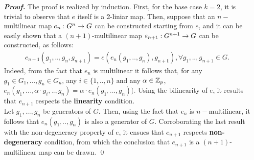 \textbf{\textit{Proof.}} The proof is realized by induction. First, for the base case $k = 2$, it is trivial to observe that $e$ itself is a 2-liniar map. Then, suppose that an $n-$multilinear map $e_n:G^n\rightarrow G$ can be constructed starting from $e$, and it can be easily shown that a $(n+1)$-multilinear map $e_{n+1}:G^{n+1}\rightarrow G$ can be constructed, as follows:
\begin{align*}
	e_{n+1}(g_1,..,g_n, g_{n+1}) = e(e_n(g_1,.., g_n), g_{n+1}), \forall g_1, .., g_{n+1} \in G.
\end{align*}
Indeed, from the fact that $e_n$ is multilinear it follows that, for any $g_1\in G_1, ..., g_n \in G_n$, any $i\in \{1,..,n\}$ and any $\alpha \in {\mathbb Z}_p$,  $e_n(g_1,...,\alpha \cdot g_i, ..,g_n) = \alpha \cdot e_n(g_1,...,g_n))$. Using the bilinearity of $e$, it results that $e_{n+1}$ respects the \textbf{linearity} condition.\\
Let $g_1, ...,g_n$ be generators of $G$. Then, using the fact that $e_{n}$ is $n-$multilinear, it follows that $e_n(g_1,..,g_n)$ is also a generator of $G$. Corroborating the last result with the non-degeneracy property of $e$, it ensues that $e_{n+1}$ respects \textbf{non-degeneracy} condition, from which the conclusion that $e_{n+1}$ is a $(n+1)$-multilinear map can be drawn. \qed\\







